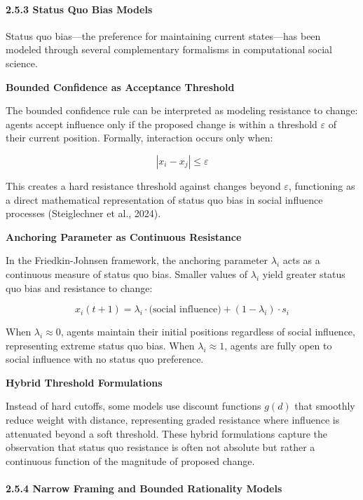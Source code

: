 \paragraph{2.5.3 Status Quo Bias Models}\label{status-quo-bias-models}

Status quo bias---the preference for maintaining current states---has
been modeled through several complementary formalisms in computational
social science.

\textbf{Bounded Confidence as Acceptance Threshold}

The bounded confidence rule can be interpreted as modeling resistance to
change: agents accept influence only if the proposed change is within a
threshold \(\varepsilon\) of their current position. Formally,
interaction occurs only when:

\[|x_i - x_j| \leq \varepsilon\]

This creates a hard resistance threshold against changes beyond
\(\varepsilon\), functioning as a direct mathematical representation of
status quo bias in social influence processes (Steiglechner et al.,
2024).

\textbf{Anchoring Parameter as Continuous Resistance}

In the Friedkin-Johnsen framework, the anchoring parameter \(\lambda_i\)
acts as a continuous measure of status quo bias. Smaller values of
\(\lambda_i\) yield greater status quo bias and resistance to change:

\[x_i(t+1) = \lambda_i \cdot \text{(social influence)} + (1 - \lambda_i) \cdot s_i\]

When \(\lambda_i \approx 0\), agents maintain their initial positions
regardless of social influence, representing extreme status quo bias.
When \(\lambda_i \approx 1\), agents are fully open to social influence
with no status quo preference.

\textbf{Hybrid Threshold Formulations}

Instead of hard cutoffs, some models use discount functions \(g(d)\)
that smoothly reduce weight with distance, representing graded
resistance where influence is attenuated beyond a soft threshold. These
hybrid formulations capture the observation that status quo resistance
is often not absolute but rather a continuous function of the magnitude
of proposed change.

\paragraph{2.5.4 Narrow Framing and Bounded Rationality
Models}\label{narrow-framing-and-bounded-rationality-models}

